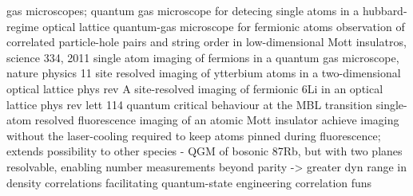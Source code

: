 gas microscopes; 
	\cite{bakr09}  quantum gas microscope for detecing single atoms in a hubbard-regime optical lattice
	\cite{cheuk15}  quantum-gas microscope for fermionic atoms
	\cite{endres11} observation of correlated particle-hole pairs and string order in low-dimensional Mott insulatros, science 334, 2011
	\cite{haller15}  single atom imaging of fermions in a quantum gas microscope, nature physics 11
	\cite{miranda15} site resolved imaging of ytterbium atoms in a two-dimensional optical lattice phys rev A
	\cite{parsons15} site-resolved imaging of fermionic 6Li in an optical lattice phys rev lett 114
	\cite{rispoli19} quantum critical behaviour at the MBL transition
	\cite{sherson10} single-atom resolved fluorescence imaging of an atomic Mott insulator
	\cite{miranda17} achieve imaging without the laser-cooling required to keep atoms pinned during fluorescence; extends possibility to other species
	\cite{preiss15a} - QGM of bosonic 87Rb, but with two planes resolvable, enabling number measurements beyond parity -> greater dyn range in density correlations
facilitating quantum-state engineering
	\cite{chiu18}%
	\cite{kozlowski17}%
	\cite{preiss15a}%
correlation funs
	\cite{endres11}%
	\cite{rispoli19}%